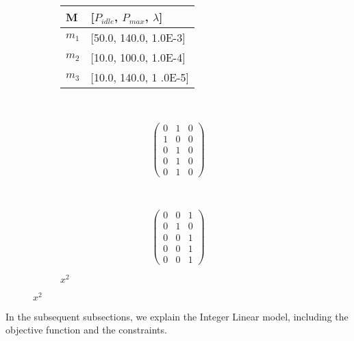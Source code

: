 \begin{figure}%
\centering\small
\begin{subfigure}[b]{0.2\textwidth}
\begin{tabular}{@{}ll@{}}
\toprule
M  & {[}$P_{idle}$, $P_{max}$, $\lambda${]} \\ \midrule
$m_1$ & {[}50.0, 140.0, 1.0E-3{]}  \\
$m_2$ & {[}10.0, 100.0, 1.0E-4{]}  \\
$m_3$ & {[}10.0, 140.0, 1 .0E-5{]}  \\ \bottomrule
\end{tabular}
\label{tbl_nodes_config}
\end{subfigure}~
\begin{subfigure}[b]{0.28\textwidth}
\centering
\begin{minipage}{.5\textwidth}
\raggedright
\caption*{$x^{1}$}\vspace{-0.4cm}
 $$
\begin{pmatrix} 
0 & 1 & 0\\
1 & 0 & 0\\
0 & 1 & 0\\
0 & 1 & 0\\
0 & 1 & 0
\end{pmatrix}
$$
\end{minipage}%
~\hspace{-0.8cm}
\begin{minipage}{0.45\textwidth}
\centering
\caption*{$x^{2}$}\vspace{-0.4cm}
$$
\begin{pmatrix} 
0 & 0 & 1\\
0 & 1 & 0\\
0 & 0 & 1\\
0 & 0 & 1\\
0 & 0 & 1
\end{pmatrix}
$$
\end{minipage}
\label{matrix_feasible_solution}
\end{subfigure}
\label{fig_nodes_config_feasible_solution}
\end{figure}

In the subsequent subsections, we explain the Integer Linear model, including the objective function and the constraints.

